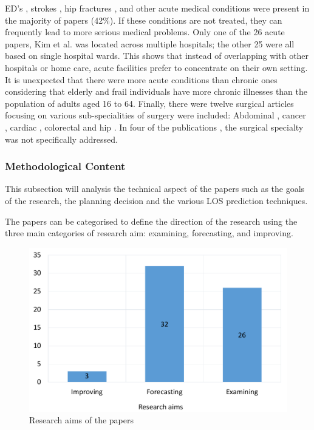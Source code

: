 \documentclass[../thesis.tex]{subfiles}
\begin{document}
ED's \cite{Bahrmann2018}, strokes \cite{Sommerfeld2011}, hip fractures \cite{Rajamaki2020}, and other acute medical conditions were present in the majority of papers (42\%). If these conditions are not treated, they can frequently lead to more serious medical problems. Only one of the 26 acute papers, Kim et al. \cite{Kim2018} was located across multiple hospitals; the other 25 were all based on single hospital wards. This shows that instead of overlapping with other hospitals or home care, acute facilities prefer to concentrate on their own setting. It is unexpected that there were more acute conditions than chronic ones considering that elderly and frail individuals have more chronic illnesses than the population of adults aged 16 to 64. Finally, there were twelve surgical articles focusing on various sub-specialities of surgery were included: Abdominal \cite{Marano2022}, cancer \cite{Raab2022}, cardiac \cite{Cacciatore2012,Kirfel2021,Pustavoitau2016}, colorectal \cite{AgasiIdenburg2019} and hip \cite{Justo2011,Willems2012}. In four of the publications \cite{Harvey2020,Jones2021, Zattoni2018, Zhao2020}, the surgical specialty was not specifically addressed.

\subsubsection{Methodological Content}
This subsection will analysis the technical aspect of the papers such as the goals of the research, the planning decision and the various LOS prediction techniques.

The papers can be categorised to define the direction of the research using the three main categories of research aim: examining, forecasting, and improving.

\begin{figure}[h!]
    \centering
    \includegraphics[scale=0.5]{Chapters/Chapter2/Figures2/aim1.pdf}
    \caption{Research aims of the papers}
    \label{fig:litreview2-aims}
\end{figure}
\end{document}
